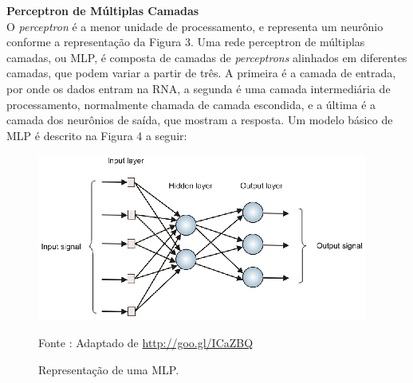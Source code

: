     \noindent
    \textbf{Perceptron de Múltiplas Camadas} \\ O \textit{perceptron} é a menor unidade de processamento, e representa um neurônio conforme a representação da Figura 3. Uma rede perceptron de múltiplas camadas, ou MLP, é composta de camadas de \textit{perceptrons} alinhados em diferentes camadas, que podem variar a partir de três. A primeira é a camada de entrada, por onde os dados entram na RNA, a segunda é uma camada intermediária de processamento, normalmente chamada de camada escondida, e a última é a camada dos neurônios de saída, que mostram a resposta. Um modelo básico de MLP é descrito na Figura 4 a seguir:

    \begin{figure}[ht]
        \centering
        \label{fig04}
            \includegraphics[keepaspectratio=true, scale=2.1]{editaveis/images/mlp.eps}
        \caption{Representação de uma MLP.}
        Fonte : Adaptado de \url{http://goo.gl/ICaZBQ}
    \end{figure}



